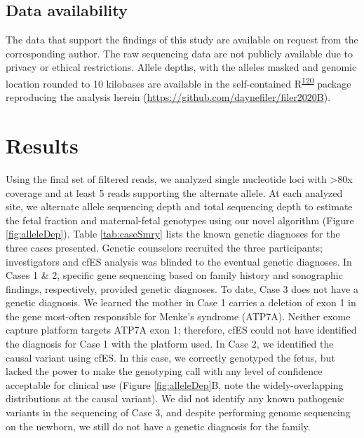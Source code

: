 \documentclass[11pt,letterpaper]{book}
\begin{document}
\hypertarget{data-availability}{%
\subsection{Data availability}\label{data-availability}}

The data that support the findings of this study are available on request from the corresponding author.
The raw sequencing data are not publicly available due to privacy or ethical restrictions.
Allele depths, with the alleles masked and genomic location rounded to 10 kilobases are available in the self-contained R\textsuperscript{\protect\hyperlink{ref-r-core-team:2019aa}{120}} package reproducing the analysis herein (\url{https://github.com/daynefiler/filer2020B}).

\hypertarget{results-1}{%
\section{Results}\label{results-1}}

Using the final set of filtered reads, we analyzed single nucleotide loci with \textgreater80x coverage and at least 5 reads supporting the alternate allele.
At each analyzed site, we alternate allele sequencing depth and total sequencing depth to estimate the fetal fraction and maternal-fetal genotypes using our novel algorithm (Figure \ref{fig:alleleDep}).
Table \ref{tab:caseSmry} lists the known genetic diagnoses for the three cases presented.
Genetic counselors recruited the three participants; investigators and cfES analysis was blinded to the eventual genetic diagnoses.
In Cases 1 \& 2, specific gene sequencing based on family history and sonographic findings, respectively, provided genetic diagnoses.
To date, Case 3 does not have a genetic diagnosis.
We learned the mother in Case 1 carries a deletion of exon 1 in the gene most-often responsible for Menke's syndrome (ATP7A).
Neither exome capture platform targets ATP7A exon 1; therefore, cfES could not have identified the diagnosis for Case 1 with the platform used.
In Case 2, we identified the causal variant using cfES.
In this case, we correctly genotyped the fetus, but lacked the power to make the genotyping call with any level of confidence acceptable for clinical use (Figure \ref{fig:alleleDep}B, note the widely-overlapping distributions at the causal variant).
We did not identify any known pathogenic variants in the sequencing of Case 3, and despite performing genome sequencing on the newborn, we still do not have a genetic diagnosis for the family.
\end{document}
